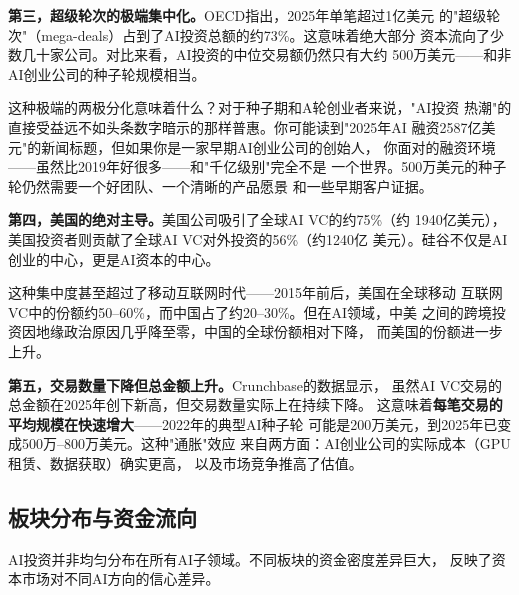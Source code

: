 \textbf{第三，超级轮次的极端集中化。}OECD指出，2025年单笔超过1亿美元
的"超级轮次"（mega-deals）占到了AI投资总额的约73\%。这意味着绝大部分
资本流向了少数几十家公司。对比来看，AI投资的中位交易额仍然只有大约
500万美元——和非AI创业公司的种子轮规模相当。

这种极端的两极分化意味着什么？对于种子期和A轮创业者来说，"AI投资
热潮"的直接受益远不如头条数字暗示的那样普惠。你可能读到"2025年AI
融资2587亿美元"的新闻标题，但如果你是一家早期AI创业公司的创始人，
你面对的融资环境——虽然比2019年好很多——和"千亿级别"完全不是
一个世界。500万美元的种子轮仍然需要一个好团队、一个清晰的产品愿景
和一些早期客户证据。

\textbf{第四，美国的绝对主导。}美国公司吸引了全球AI VC的约75\%（约
1940亿美元），美国投资者则贡献了全球AI VC对外投资的56\%（约1240亿
美元）。硅谷不仅是AI创业的中心，更是AI资本的中心。

这种集中度甚至超过了移动互联网时代——2015年前后，美国在全球移动
互联网VC中的份额约50--60\%，而中国占了约20--30\%。但在AI领域，中美
之间的跨境投资因地缘政治原因几乎降至零，中国的全球份额相对下降，
而美国的份额进一步上升。

\textbf{第五，交易数量下降但总金额上升。}Crunchbase的数据显示，
虽然AI VC交易的总金额在2025年创下新高，但交易数量实际上在持续下降。
这意味着\textbf{每笔交易的平均规模在快速增大}——2022年的典型AI种子轮
可能是200万美元，到2025年已变成500万--800万美元。这种"通胀"效应
来自两方面：AI创业公司的实际成本（GPU租赁、数据获取）确实更高，
以及市场竞争推高了估值。

\subsection{板块分布与资金流向}
\label{subsec:fund-sectors}

AI投资并非均匀分布在所有AI子领域。不同板块的资金密度差异巨大，
反映了资本市场对不同AI方向的信心差异。


